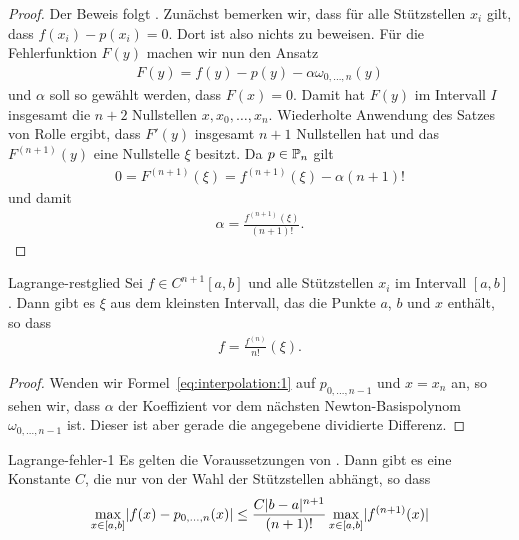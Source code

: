 \begin{proof}
  Der Beweis folgt \cite[Satz 2.1.4.1]{Stoer83}.  Zunächst bemerken
  wir, dass für alle Stützstellen $x_i$ gilt, dass
  $f(x_i) - p(x_i) = 0$. Dort ist also nichts zu beweisen.
  Für die Fehlerfunktion $F(y)$ machen wir nun den Ansatz
  \begin{gather}
    \label{eq:interpolation:1}
    F(y) = f(y)-p(y) - \alpha \omega_{0,\dots,n}(y)
  \end{gather}
  und $\alpha$ soll so gewählt werden, dass $F(x) = 0$. Damit hat $F(y)$ im
  Intervall $I$ insgesamt die $n+2$ Nullstellen $x,x_0,\dots,x_n$.
  Wiederholte Anwendung des Satzes von Rolle ergibt, dass $F'(y)$
  insgesamt $n+1$ Nullstellen hat und das $F^{(n+1)}(y)$ eine
  Nullstelle $\xi$ besitzt. Da $p\in \P_n$ gilt
  \begin{gather}
    0 = F^{(n+1)}(\xi) = f^{(n+1)}(\xi) - \alpha (n+1)!
  \end{gather}
  und damit
  \begin{gather}
    \alpha = \frac{f^{(n+1)}(\xi)}{(n+1)!}.
  \end{gather}
\end{proof}

\begin{Korollar}{Lagrange-restglied}
  Sei $f \in C^{n+1}[a,b]$ und alle Stützstellen $x_i$ im Intervall
  $[a,b]$. Dann gibt es $\xi$ aus dem kleinsten Intervall, das die Punkte $a$, $b$ und $x$ enthält, so dass
  \begin{gather}
    [x_0,\dots,x_n]f = \frac{f^{(n)}}{n!}(\xi).
  \end{gather}
\end{Korollar}

\begin{proof}
  Wenden wir Formel~\eqref{eq:interpolation:1} auf $p_{0,\dots,n-1}$
und $x=x_n$ an, so sehen wir, dass $\alpha$ der Koeffizient vor dem
nächsten Newton-Basispolynom $\omega_{0,\dots,n-1}$ ist. Dieser ist
aber gerade die angegebene dividierte Differenz.
\end{proof}

\begin{Korollar}{Lagrange-fehler-1}
  Es gelten die Voraussetzungen von
  . Dann gibt es eine Konstante
  $C$, die nur von der Wahl der Stützstellen abhängt, so dass
  \begin{gather}
    \max_{x\in[a,b]} \abs{f(x)-p_{0,\dots,n}(x)}
    \le \frac{C \abs{b-a}^{n+1}}{(n+1)!} \max_{x\in[a,b]} \abs{f^{(n+1)}(x)} 
  \end{gather}
\end{Korollar}

